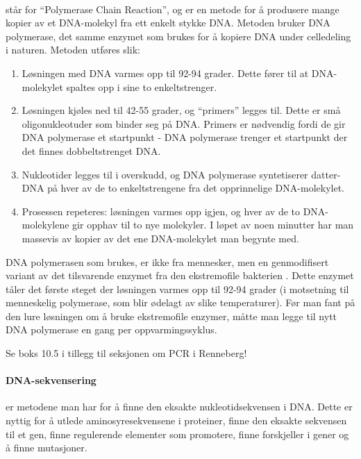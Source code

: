 \paragraph{} står for ``Polymerase Chain Reaction'', og er en metode for å produsere mange kopier av et DNA-molekyl fra ett enkelt stykke DNA. Metoden bruker DNA polymerase, det samme enzymet som brukes for å kopiere DNA under celledeling i naturen. Metoden utføres slik: 
\begin{enumerate}
	\item Løsningen med DNA varmes opp til 92-94 grader. Dette fører til at DNA-molekylet spaltes opp i sine to enkeltstrenger.
	\item Løsningen kjøles ned til 42-55 grader, og ``primers'' legges til. Dette er små oligonukleotuder som binder seg på DNA. Primers er nødvendig fordi de gir DNA polymerase et startpunkt - DNA polymerase trenger et startpunkt der det finnes dobbeltstrenget DNA.
	\item Nukleotider legges til i overskudd, og DNA polymerase syntetiserer datter-DNA på hver av de to enkeltstrengene fra det opprinnelige DNA-molekylet.
	\item Prosessen repeteres: løsningen varmes opp igjen, og hver av de to DNA-molekylene gir opphav til to nye molekyler. I løpet av noen minutter har man massevis av kopier av det ene DNA-molekylet man begynte med.
\end{enumerate}
DNA polymerasen som brukes, er ikke fra mennesker, men en genmodifisert variant av det tilsvarende enzymet fra den ekstremofile bakterien  . Dette enzymet tåler det første steget der løsningen varmes opp til 92-94 grader (i motsetning til menneskelig polymerase, som blir ødelagt av slike temperaturer). Før man fant på den lure løsningen om å bruke ekstremofile enzymer, måtte man legge til nytt DNA polymerase en gang per oppvarmingssyklus.

Se boks 10.5 i tillegg til seksjonen om PCR i Renneberg!

\paragraph{DNA-sekvensering}  er metodene man har for å finne den eksakte nukleotidsekvensen i DNA. Dette er nyttig for å utlede aminosyresekvensene i proteiner, finne den eksakte sekvensen til et gen, finne regulerende elementer som promotere, finne forskjeller i gener og å finne mutasjoner.

